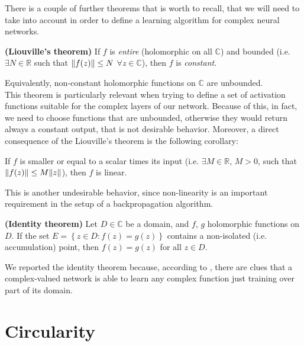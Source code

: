 \documentclass[../main.tex]{subfiles}
\begin{document}
There is a couple of further theorems that is worth to recall, that we will need to take into account in order to define a learning algorithm for complex neural networks.
\begin{theorem}
\textbf{(Liouville's theorem)} If $f$ is \textit{entire} (holomorphic on all $\mathds{C}$) and bounded (i.e. $\exists N\in\mathds{R}$ such that $\norm{f(z)}\leq N$ $\forall z\in\mathds{C}$), then $f$ is \textit{constant}.
\label{th:Liouville}
\end{theorem}
Equivalently, non-constant holomorphic functions on $\mathds{C}$ are unbounded.\\
This theorem is particularly relevant when trying to define a set of activation functions suitable for the complex layers of our network. Because of this, in fact, we need to choose functions that are unbounded, otherwise they would return always a constant output, that is not desirable behavior. Moreover, a direct consequence of the Liouville's theorem is the following corollary:
\begin{corollary}
If $f$ is smaller or equal to a scalar times its input (i.e. $\exists M\in\mathds{R}$, $M>0$, such that $\norm{f(z)}\leq M\norm{z}$), then $f$ is linear.
\end{corollary}
This is another undesirable behavior, since non-linearity is an important requirement in the setup of a backpropagation algorithm.
\begin{theorem}
\textbf{(Identity theorem)} Let $D\in\mathds{C}$ be a domain, and $f$, $g$ holomorphic functions on $D$. If the set $E = \left\{z\in D: f(z)=g(z)\right\}$ contains a non-isolated (i.e. accumulation) point, then $f(z)=g(z)$ for all $z\in D$.
\label{th:identity}
\end{theorem}
We reported the identity theorem because, according to \cite{Nitta_complexBP}, there are clues that a complex-valued network is able to learn any complex function just training over part of its domain.

\section{Circularity}
\label{sec:circularity}
\end{document}
